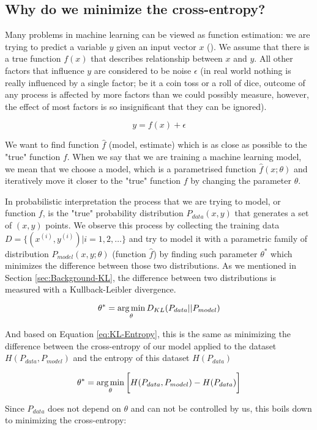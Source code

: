 \subsection{Why do we minimize the cross-entropy?}
\label{sec:Background-Likelihood}

Many problems in machine learning can be viewed as function estimation: we are trying to predict a variable $y$ given an input vector $x$ (\cite{Good16}). We assume that there is a true function $f(x)$ that describes relationship between $x$ and $y$. All other factors that influence $y$ are considered to be noise $\epsilon$ (in real world nothing is really influenced by a single factor; be it a coin toss or a roll of dice, outcome of any process is affected by more factors than we could possibly measure, however, the effect of most factors is so insignificant that they can be ignored).

\[ y = f(x) + \epsilon \]

We want to find function $\hat{f}$ (model, estimate) which is as close as possible to the "true" function $f$. When we say that we are training a machine learning model, we mean that we choose a model, which is a parametrised function $\hat{f}(x;\theta)$ and iteratively move it closer to the "true" function $f$ by changing the parameter $\theta$.

In probabilistic interpretation the process that we are trying to model, or function $f$, is the "true" probability distribution $P_{data}(x, y)$ that generates a set of $(x, y)$ points. We observe this process by collecting the training data $D =\{(x^{(i)}, y^{(i)})|i=1,2,\dots\}$ and try to model it with a parametric family of distribution $P_{model}(x, y; \theta)$ (function $\hat{f}$) by finding such parameter $\theta^{*}$ which minimizes the difference between those two distributions. As we mentioned in Section \ref{sec:Background-KL}, the difference between two distributions is measured with a Kullback-Leibler divergence.

\[ \theta^{*} = \operatorname*{arg\,min}_{\theta} D_{KL}(P_{data}||P_{model}) \]

And based on Equation \ref{eq:KL-Entropy}, this is the same as minimizing the difference between the cross-entropy of our model applied to the dataset $H(P_{data}, P_{model})$ and the entropy of this dataset $H(P_{data})$

\[ \theta^{*} = \operatorname*{arg\,min}_{\theta} \bigg[H(P_{data}, P_{model}) - H(P_{data})\bigg] \]

Since $P_{data}$ does not depend on $\theta$ and can not be controlled by us, this boils down to minimizing the cross-entropy:

